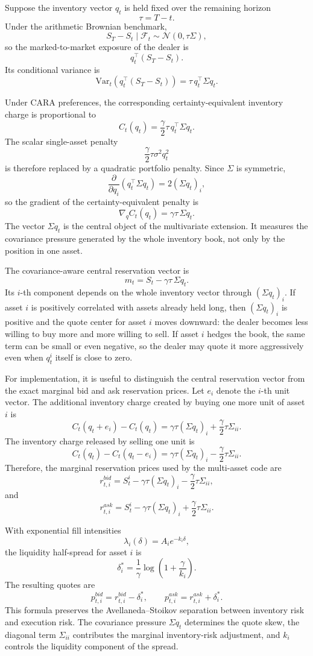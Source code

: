 \documentclass[a4paper,10pt,titlepage,oneside,openany]{book}
\theoremstyle{plain}\newtheorem{theorem}{Theorem}[chapter]
\theoremstyle{definition}\newtheorem{definition}{Definition}[chapter]
\theoremstyle{remark}\newtheorem{remark}{Remark}[chapter]
\begin{document}
Suppose the inventory vector $q_t$ is held fixed over the remaining horizon
\[
\tau=T-t.
\]
Under the arithmetic Brownian benchmark,
\[
S_T-S_t\mid\mathcal{F}_t
\sim
\mathcal{N}(0,\tau\Sigma),
\]
so the marked-to-market exposure of the dealer is
\[
q_t^\top(S_T-S_t).
\]
Its conditional variance is
\[
\mathrm{Var}_t\!\left(q_t^\top(S_T-S_t)\right)
=
\tau\,q_t^\top\Sigma q_t.
\]

Under CARA preferences, the corresponding certainty-equivalent inventory charge is proportional to
\[
C_t(q_t)
=
\frac{\gamma}{2}\tau\,q_t^\top\Sigma q_t.
\]
The scalar single-asset penalty
\[
\frac{\gamma}{2}\tau\sigma^2q_t^2
\]
is therefore replaced by a quadratic portfolio penalty. Since $\Sigma$ is symmetric,
\[
\frac{\partial}{\partial q_i}\left(q_t^\top\Sigma q_t\right)
=
2(\Sigma q_t)_i,
\]
so the gradient of the certainty-equivalent penalty is
\[
\nabla_q C_t(q_t)
=
\gamma\tau\,\Sigma q_t.
\]
The vector $\Sigma q_t$ is the central object of the multivariate extension. It measures the covariance pressure generated by the whole inventory book, not only by the position in one asset.

The covariance-aware central reservation vector is
\[
m_t
=
S_t-\gamma\tau\,\Sigma q_t.
\]
Its $i$-th component depends on the whole inventory vector through $(\Sigma q_t)_i$. If asset $i$ is positively correlated with assets already held long, then $(\Sigma q_t)_i$ is positive and the quote center for asset $i$ moves downward: the dealer becomes less willing to buy more and more willing to sell. If asset $i$ hedges the book, the same term can be small or even negative, so the dealer may quote it more aggressively even when $q_t^i$ itself is close to zero.

For implementation, it is useful to distinguish the central reservation vector from the exact marginal bid and ask reservation prices. Let $e_i$ denote the $i$-th unit vector. The additional inventory charge created by buying one more unit of asset $i$ is
\[
C_t(q_t+e_i)-C_t(q_t)
=
\gamma\tau(\Sigma q_t)_i
+
\frac{\gamma}{2}\tau\Sigma_{ii}.
\]
The inventory charge released by selling one unit is
\[
C_t(q_t)-C_t(q_t-e_i)
=
\gamma\tau(\Sigma q_t)_i
-
\frac{\gamma}{2}\tau\Sigma_{ii}.
\]
Therefore, the marginal reservation prices used by the multi-asset code are
\[
r_{t,i}^{bid}
=
S_t^i-\gamma\tau(\Sigma q_t)_i
-
\frac{\gamma}{2}\tau\Sigma_{ii},
\]
and
\[
r_{t,i}^{ask}
=
S_t^i-\gamma\tau(\Sigma q_t)_i
+
\frac{\gamma}{2}\tau\Sigma_{ii}.
\]

With exponential fill intensities
\[
\lambda_i(\delta)=A_i e^{-k_i\delta},
\]
the liquidity half-spread for asset $i$ is
\[
\delta_i^*
=
\frac{1}{\gamma}
\log\!\left(1+\frac{\gamma}{k_i}\right).
\]
The resulting quotes are
\[
p_{t,i}^{bid}
=
r_{t,i}^{bid}-\delta_i^*,
\qquad
p_{t,i}^{ask}
=
r_{t,i}^{ask}+\delta_i^*.
\]
This formula preserves the Avellaneda--Stoikov separation between inventory risk and execution risk. The covariance pressure $\Sigma q_t$ determines the quote skew, the diagonal term $\Sigma_{ii}$ contributes the marginal inventory-risk adjustment, and $k_i$ controls the liquidity component of the spread.
\end{document}
